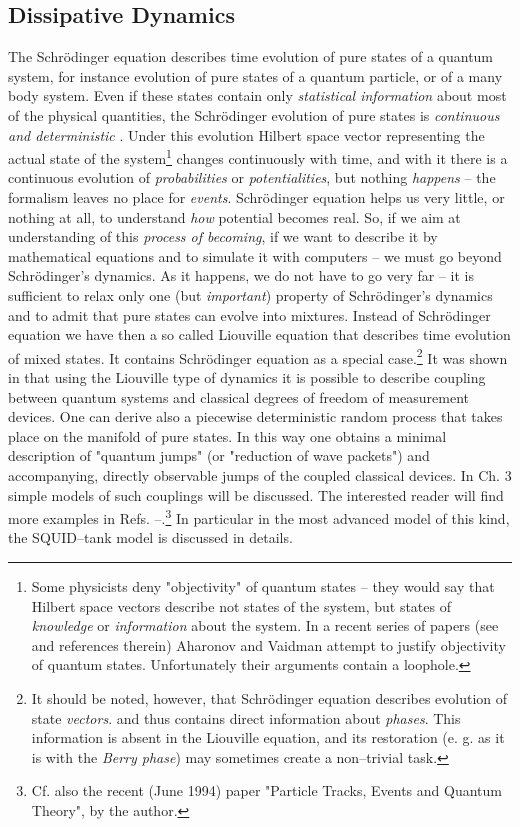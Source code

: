 \documentclass[12pt]{article}
\begin{document}
\subsection{Dissipative Dynamics}

The Schr\"odinger equation describes time evolution of pure states of a quantum
system,  for instance evolution of pure states of a quantum particle, 
 or of a many body system.  
Even if these states
contain only {\sl statistical information} about most of the physical
 quantities,  the
Schr\"odinger evolution of pure states is {\sl continuous and deterministic}
.  Under this evolution Hilbert space vector representing the actual state of
the system\footnote{Some physicists deny "objectivity" of quantum states
-- they would say that Hilbert space vectors describe not
states of the system,  but states of {\sl knowledge} or {\sl
information} about  the system.  In a recent series of
papers  (see \cite{aha} and references therein)
Aharonov and Vaidman \cite{aha}
attempt to justify
objectivity of quantum states.  Unfortunately their arguments contain
a loophole. } changes
continuously with time,  and with it there is a continuous evolution of {\sl 
probabilities} or {\sl potentialities},  but nothing {\sl happens} -- the
formalism leaves no place for {\sl events}.  Schr\"odinger equation helps us
very little,  or nothing at all,  to understand {\sl how} potential becomes
real.  So,  if we aim at understanding of this {\sl process of becoming},  if we
want to describe it by mathematical equations and to simulate it with
computers -- we must go beyond Schr\"odinger's dynamics.  As it happens,  we
do not have to go very far -- it is sufficient to relax only one  (but {\sl 
important}) property of Schr\"odinger's dynamics and to admit that pure
states can evolve into mixtures.  Instead of Schr\"odinger equation we have
then a so called Liouville equation that describes time evolution of mixed
states.  It contains Schr\"odinger
equation as a special case.\footnote{
It should be noted,  however,  that Schr\"odinger equation
describes evolution of state {\sl vectors}.  and thus contains direct
information about {\sl phases}.  This information is absent in
the Liouville equation,  and its restoration  (e. g.  as it is with the
{\sl Berry phase}) 
may sometimes create  a non--trivial task. }
It was shown in \cite{bla5} that using the Liouville type of
dynamics it is possible to describe coupling between quantum
systems and classical degrees of freedom of measurement devices. 
One can derive also a piecewise deterministic random process
that takes place on the manifold of pure states.  In  this way
one obtains a minimal description of "quantum jumps"  (or
"reduction of wave packets") and accompanying,  directly
observable jumps of the coupled classical devices.  In Ch.  3
simple models of such couplings will be discussed.  The
interested reader will find more examples in Refs. 
\cite{bla2}--\cite{bla5}.\footnote{Cf. also the recent (June 1994) paper "Particle Tracks,
Events and Quantum Theory", by the author.}
In particular in \cite{bla5} the most
advanced model of this kind,  the SQUID--tank
model is discussed in details.
\end{document}
